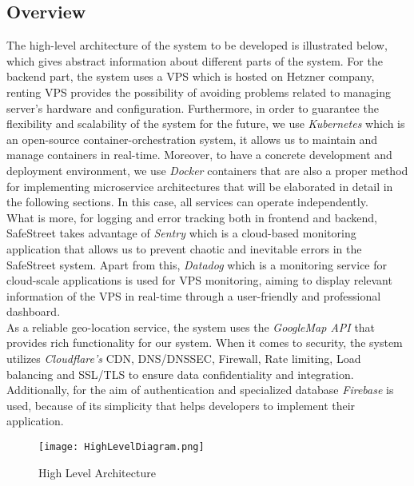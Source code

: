 \subsection{Overview}
The high-level architecture of the system to be developed is illustrated below, which gives abstract information about different parts of the system. For the backend part, the system uses a VPS which is hosted on Hetzner company, renting VPS provides the possibility of avoiding problems related to managing server’s hardware and configuration. Furthermore, in order to guarantee the flexibility and scalability of the system for the future, we use \emph{Kubernetes} which is an open-source container-orchestration system, it allows us to maintain and manage containers in real-time. Moreover, to have a concrete development and deployment environment, we use \emph{Docker} containers that are also a proper method for implementing microservice architectures that will be elaborated in detail in the following sections. In this case, all services can operate independently. \\
What is more, for logging and error tracking both in frontend and backend, SafeStreet takes advantage of \emph{Sentry} which is a cloud-based monitoring application that allows us to prevent chaotic and inevitable errors in the SafeStreet system. Apart from this, \emph{Datadog} which is a monitoring service for cloud-scale applications is used for VPS monitoring, aiming to display relevant information of the VPS in real-time through a user-friendly and professional dashboard. \\
As a reliable geo-location service, the system uses the \emph{GoogleMap API} that provides rich functionality for our system. When it comes to security, the system utilizes \emph{Cloudflare’s} CDN, DNS/DNSSEC, Firewall, Rate limiting, Load balancing and SSL/TLS to ensure data confidentiality and integration. Additionally, for the aim of authentication and specialized database \emph{Firebase} is used, because of its simplicity that helps developers to implement their application. 


\begin{figure}[H]
\caption{High Level Architecture}
\label{fig:HighLevel}
\centering
\texttt{[image: HighLevelDiagram.png]}
\end{figure}
